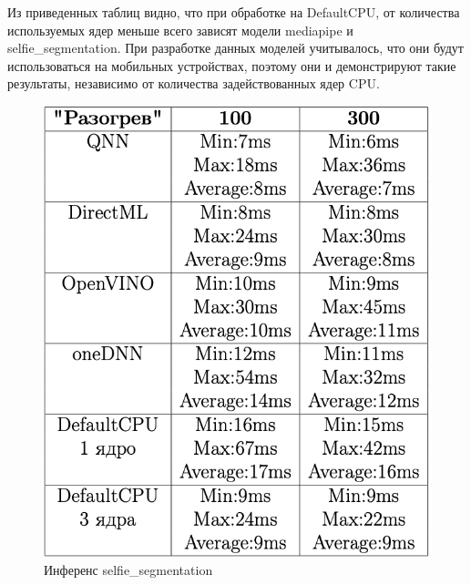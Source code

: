 \documentclass[a4paper,14pt]{extreport}
\begin{document}
        Из приведенных таблиц видно, что при обработке на DefaultCPU, от количества используемых ядер меньше всего зависят модели mediapipe и selfie\_segmentation. При разработке данных моделей учитывалось, что они будут использоваться на мобильных устройствах, поэтому они и демонстрируют такие результаты, независимо от количества задействованных ядер CPU.

        \begin{figure}[!h]
            \begin{center}
                \begin{minipage}[h]{0.4\linewidth}
                    \includegraphics[width=1\linewidth]{images-results/selfie.png}
                    \caption{Инференс selfie\_segmentation}
                    \label{ris:selfie}
                \end{minipage}
                \hfill
                \begin{minipage}[h]{0.4\linewidth}

\end{minipage}
\end{center}
\end{figure}
\end{document}
